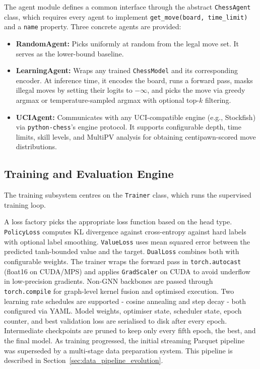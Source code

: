 The agent module defines a common interface through the abstract \texttt{ChessAgent} class, which requires every agent to implement \texttt{get\_move(board, time\_limit)} and a \texttt{name} property. Three concrete agents are provided:

\begin{itemize}
    \item \textbf{RandomAgent:} Picks uniformly at random from the legal move set. It serves as the lower-bound baseline.
    \item \textbf{LearningAgent:} Wraps any trained \texttt{ChessModel} and its corresponding encoder. At inference time, it encodes the board, runs a forward pass, masks illegal moves by setting their logits to $-\infty$, and picks the move via greedy argmax or temperature-sampled argmax with optional top-$k$ filtering.
    \item \textbf{UCIAgent:} Communicates with any UCI-compatible engine (e.g., Stockfish) via \texttt{python-chess}'s engine protocol. It supports configurable depth, time limits, skill levels, and MultiPV analysis for obtaining centipawn-scored move distributions.
\end{itemize}

\subsection{Training and Evaluation Engine}

The training subsystem centres on the \texttt{Trainer} class, which runs the supervised training loop.

A loss factory picks the appropriate loss function based on the head type. \texttt{PolicyLoss} computes KL divergence against cross-entropy against hard labels with optional label smoothing. \texttt{ValueLoss} uses mean squared error between the predicted tanh-bounded value and the target. \texttt{DualLoss} combines both with configurable weights. The trainer wraps the forward pass in \texttt{torch.autocast} (float16 on CUDA/MPS) and applies \texttt{GradScaler} on CUDA to avoid underflow in low-precision gradients. Non-GNN backbones are passed through \texttt{torch.compile} for graph-level kernel fusion and optimised execution.
Two learning rate schedules are supported - cosine annealing and step decay - both configured via YAML. Model weights, optimiser state, scheduler state, epoch counter, and best validation loss are serialised to disk after every epoch. Intermediate checkpoints are pruned to keep only every fifth epoch, the best, and the final model.
As training progressed, the initial streaming Parquet pipeline was superseded by a multi-stage data preparation system. This pipeline is described in Section~\ref{sec:data_pipeline_evolution}.

